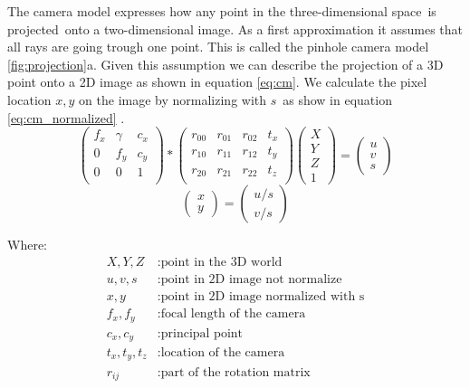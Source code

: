 \documentclass[11pt,a4paper,titlepage,oneside]{report}
\begin{document}
The camera model expresses how any point in the three-dimensional space is projected onto a two-dimensional image. As a first approximation it assumes that all rays are going trough one point. This is called the pinhole camera model \ref{fig:projection}a. Given this assumption we can describe the projection of a 3D point onto a 2D image as shown in equation \ref{eq:cm}. We calculate the pixel location $x,y$ on the image by normalizing with $s$ as show in equation \ref{eq:cm_normalized} \cite{rvc}.
\begin{equation}\label{eq:cm}
  \begin{pmatrix}
		f_x & \gamma & c_x \\
		0 & f_y & c_y \\
		0 & 0 & 1 \\
	\end{pmatrix}*
	\begin{pmatrix}
		r_{00} & r_{01} & r_{02} & t_x \\
		r_{10} & r_{11} & r_{12} & t_y \\
		r_{20} & r_{21} & r_{22} & t_z \\
	\end{pmatrix}
	\begin{pmatrix}
		X \\
		Y \\
		Z \\
		1
	\end{pmatrix}=
	\begin{pmatrix}
		u \\
		v \\
		s
  \end{pmatrix}
\end{equation}
\begin{equation}\label{eq:cm_normalized}
	\begin{pmatrix}
		x \\
		y
	\end{pmatrix}=
	\begin{pmatrix}
		u/s \\
		v/s 
  \end{pmatrix}
\end{equation}

Where:
\begin{align*}
  X,Y,Z			&: \text{point in the 3D world}\\
	u,v,s	   	&: \text{point in 2D image not normalize}\\
	x,y				&: \text{point in 2D image normalized with s}\\
	f_x,f_y  	&: \text{focal length of the camera}\\
  c_x,c_y  	&: \text{principal point}\\
  t_x,t_y,t_z	&: \text{location of the camera}\\
  r_{ij}	&: \text{part of the rotation matrix}
\end{align*}
\end{document}
